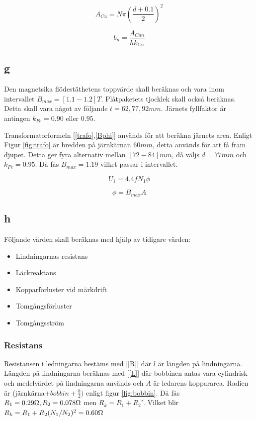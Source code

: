 \documentclass{article}
\begin{document}
\begin{equation}
  A_{Cu}=N\pi(\frac{d+0.1}{2})^2
 \label{Acu}
 \end{equation}

\begin{equation}
  b_n=\frac{A_{Cun}}{h k_{Cu}}
  \label{bn}
\end{equation}

\subsection{g}
Den magnetsika flödestäthetens toppvärde skall beräknas och vara inom intervallet $B_{max}=[1.1 - 1.2] T$.
Plåtpaketets tjocklek skall också beräknas.
Detta skall vara något av följande $t = 62, 77, 92 mm$.
Järnets fyllfaktor är antingen $k_{Fe}=0.90$ eller $0.95$.

Transformatorformeln [\ref{trafo},\ref{Bphi}] används för att beräkna järnets area.
Enligt Figur \ref{fig:trafo} är bredden på järnkärnan $60 mm$, detta används för att få fram djupet.
Detta ger fyra alternativ mellan $[72 - 84] mm$, då väljs $d=77 mm$ och $k_{Fe}=0.95$.
Då fås $B_{max}=1.19$ vilket passar i intervallet.


\begin{equation}
  U_1=4.4 f N_1 \phi
  \label{trafo}
\end{equation}

\begin{equation}
  \phi=B_{max} A
  \label{Bphi}
\end{equation}

\subsection{h}
Följande värden skall beräknas med hjälp av tidigare värden:

\begin{itemize}
  \item Lindningarnas resistans
  \item Läckreaktans
  \item Kopparförluster vid märkdrift
  \item Tomgångsförluster
  \item Tomgångsström
\end{itemize}

\subsubsection{Resistans}
Resistansen i ledningarna bestäms med [\ref{R}] där $l$ är längden på lindningarna.
Längden på lindningarna beräknas med [\ref{L}] där bobbinen antas vara cylindrisk och medelvärdet på lindningarna används och $A$ är ledarens koppararea.
Radien är (järnkärna$+bobbin+\frac{b}{2})$ enligt figur \ref{fig:bobbin}.
Då fås $R_1=0.29 \ohm,R_2=0.078 \ohm$ men $R_k=R_1+R_2'$.
Vilket blir $R_k=R_1+R_2 (N_1/N_2)^2=0.60 \ohm$
\end{document}
